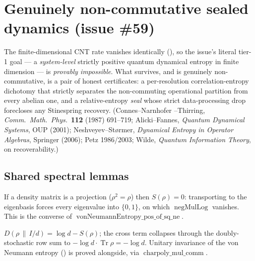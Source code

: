 \section{Genuinely non-commutative sealed dynamics (issue \#59)}\label{sec:quantum-seal}

The finite-dimensional CNT rate vanishes identically (), so the
issue's literal tier-1 goal --- a \emph{system-level} strictly positive quantum dynamical entropy in
finite dimension --- is \emph{provably impossible}. What survives, and is genuinely non-commutative,
is a pair of honest certificates: a per-resolution correlation-entropy dichotomy that strictly
separates the non-commuting operational partition from every abelian one, and a relative-entropy
\emph{seal} whose strict data-processing drop forecloses any Stinespring recovery. (Connes--Narnhofer
--Thirring, \emph{Comm.\ Math.\ Phys.}\ \textbf{112} (1987) 691--719; Alicki--Fannes, \emph{Quantum
Dynamical Systems}, OUP (2001); Neshveyev--St\o rmer, \emph{Dynamical Entropy in Operator Algebras},
Springer (2006); Petz 1986/2003; Wilde, \emph{Quantum Information Theory}, on recoverability.)

\subsection{Shared spectral lemmas}

\begin{lemma}\label{vonNeumannEntropy_eq_zero_of_sq_eq}
  \leanok
  If a density matrix is a projection (\(\rho^2 = \rho\)) then \(S(\rho) = 0\): transporting to the
  eigenbasis forces every eigenvalue into \(\{0,1\}\), on which \(\operatorname{negMulLog}\) vanishes.
  This is the converse of \(\operatorname{vonNeumannEntropy\_pos\_of\_sq\_ne}\).
\end{lemma}

\begin{lemma}\label{relEntropy_maximallyMixed}
  \leanok
  \(D(\rho\,\|\,I/d) = \log d - S(\rho)\); the cross term collapses through the doubly-stochastic row
  sum to \(-\log d\cdot\operatorname{Tr}\rho = -\log d\). Unitary invariance of the von Neumann
  entropy () is proved alongside, via
  \(\operatorname{charpoly\_mul\_comm}\).
\end{lemma}

